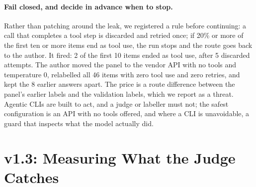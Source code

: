 \documentclass[10pt,a4paper]{article}
\newcommand{\devset}{\textsuperscript{\textsf{\tiny[dev]}}}
\begin{document}
\paragraph{Fail closed, and decide in advance when to stop.}
Rather than patching around the leak, we registered a rule before continuing: a call that completes a tool step is
discarded and retried once; if 20\% or more of the first ten or more items end as tool use, the run stops and the
route goes back to the author. It fired: 2 of the first 10 items ended as tool use, after 5 discarded attempts. The
author moved the panel to the vendor API with no tools and temperature 0, relabelled all 46 items with zero tool use
and zero retries, and kept the 8 earlier answers apart.
The price is a route difference between the panel's earlier labels and the validation labels, which we report as a
threat.
Agentic CLIs are built to act, and a judge or labeller must not; the safest configuration is an API with no tools
offered, and where a CLI is unavoidable, a guard that inspects what the model actually did.

\section{v1.3: Measuring What the Judge Catches}\label{sec:v13}

\end{document}
